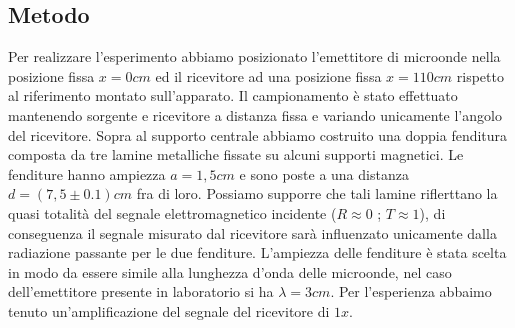 \documentclass[a4paper]{article}
\begin{document}
\subsection{Metodo}
Per realizzare l'esperimento abbiamo posizionato l'emettitore di microonde nella posizione fissa $x=0cm$ ed il ricevitore ad una posizione fissa $x=110cm$ rispetto al riferimento montato sull'apparato. Il campionamento è stato effettuato mantenendo sorgente e ricevitore a distanza fissa e variando unicamente l'angolo del ricevitore. Sopra al supporto centrale abbiamo costruito una doppia fenditura composta da tre lamine metalliche fissate su alcuni supporti magnetici. Le fenditure hanno ampiezza $a=1,5cm$ e sono poste a una distanza $d=(7,5\pm0.1)cm$ fra di loro. Possiamo supporre che tali lamine riflerttano la quasi totalità del segnale elettromagnetico incidente ($R\approx0$ ; $T\approx1$), di conseguenza il segnale misurato dal ricevitore sarà influenzato unicamente dalla radiazione passante per le due fenditure. L'ampiezza delle fenditure è stata scelta in modo da essere simile alla lunghezza d'onda delle microonde, nel caso dell'emettitore presente in laboratorio si ha $\lambda=3cm$.
Per l'esperienza abbaimo tenuto un'amplificazione del segnale del ricevitore di $1x$.
\end{document}
